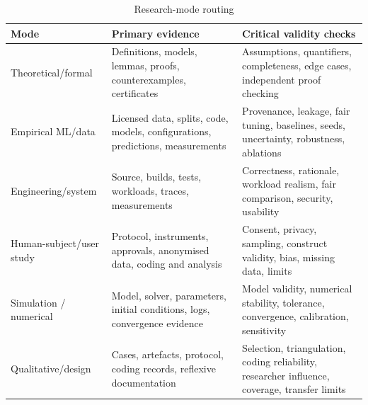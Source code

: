 \begin{table}[H]
  \centering
  \caption*{Research-mode routing}
  \begin{tabularx}{\textwidth}{@{}p{}X X@{}}
    \toprule
    \textbf{Mode} & \textbf{Primary evidence} & \textbf{Critical validity checks} \\
    \midrule
    Theoretical/formal & Definitions, models, lemmas, proofs, counterexamples, certificates & Assumptions, quantifiers, completeness, edge cases, independent proof checking \\
    Empirical ML/data & Licensed data, splits, code, models, configurations, predictions, measurements & Provenance, leakage, fair tuning, baselines, seeds, uncertainty, robustness, ablations \\
    Engineering/system & Source, builds, tests, workloads, traces, measurements & Correctness, rationale, workload realism, fair comparison, security, usability \\
    Human-subject/user study & Protocol, instruments, approvals, anonymised data, coding and analysis & Consent, privacy, sampling, construct validity, bias, missing data, limits \\
    Simulation / numerical & Model, solver, parameters, initial conditions, logs, convergence evidence & Model validity, numerical stability, tolerance, convergence, calibration, sensitivity \\
    Qualitative/design & Cases, artefacts, protocol, coding records, reflexive documentation & Selection, triangulation, coding reliability, researcher influence, coverage, transfer limits \\
    \bottomrule
  \end{tabularx}
\end{table}

